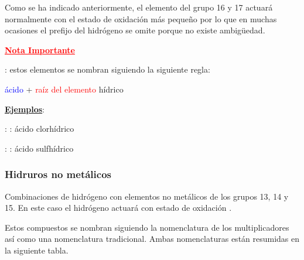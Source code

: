 \documentclass[11pt, a4paper]{article}
\begin{document}
Como se ha indicado anteriormente, el elemento del grupo 16 y 17 actuará normalmente con el estado de oxidación más pequeño por lo que en muchas ocasiones el prefijo del hidrógeno se omite porque no existe ambigüedad.

\textcolor{red}{\textbf{\underline{Nota Importante}}}

\textbf{}: estos elementos se nombran siguiendo la siguiente regla:
\begin{center}
    \textcolor{blue}{ácido} + \textcolor{red}{raíz del elemento} \textcolor{green!50!black}{hídrico}
\end{center}

\textbf{\uline{Ejemplos}}:

 : : ácido clorhídrico

 : : ácido sulfhídrico

\subsubsection{Hidruros no metálicos}

Combinaciones de hidrógeno con elementos no metálicos de los grupos 13, 14 y 15. En este caso el hidrógeno actuará con estado de oxidación .

Estos compuestos se nombran siguiendo la nomenclatura de los multiplicadores así como una nomenclatura tradicional. Ambas nomenclaturas están resumidas en la siguiente tabla.
\end{document}
